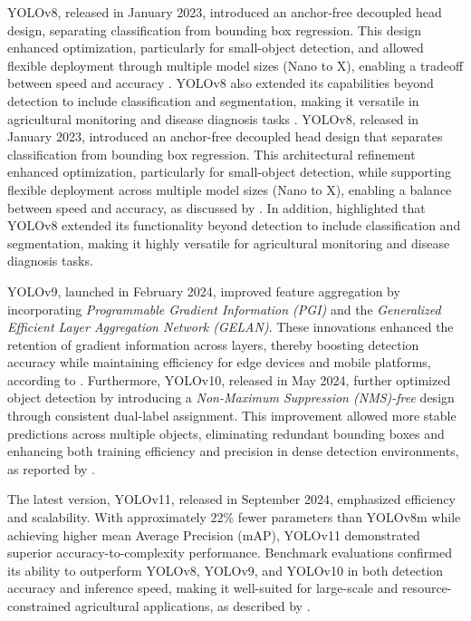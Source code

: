 YOLOv8, released in January 2023, introduced an anchor-free decoupled head design, separating classification from bounding box regression. This design enhanced optimization, particularly for small-object detection, and allowed flexible deployment through multiple model sizes (Nano to X), enabling a tradeoff between speed and accuracy \cite{Wang2023}. YOLOv8 also extended its capabilities beyond detection to include classification and segmentation, making it versatile in agricultural monitoring and disease diagnosis tasks \cite{Vyas2023}.
YOLOv8, released in January 2023, introduced an anchor-free decoupled head design that separates classification from bounding box regression. This architectural refinement enhanced optimization, particularly for small-object detection, while supporting flexible deployment across multiple model sizes (Nano to X), enabling a balance between speed and accuracy, as discussed by \cite{Wang2023}. In addition, \cite{Vyas2023} highlighted that YOLOv8 extended its functionality beyond detection to include classification and segmentation, making it highly versatile for agricultural monitoring and disease diagnosis tasks.

YOLOv9, launched in February 2024, improved feature aggregation by incorporating \textit{Programmable Gradient Information (PGI)} and the \textit{Generalized Efficient Layer Aggregation Network (GELAN)}. These innovations enhanced the retention of gradient information across layers, thereby boosting detection accuracy while maintaining efficiency for edge devices and mobile platforms, according to \cite{UltralyticsBlog2025}. Furthermore, YOLOv10, released in May 2024, further optimized object detection by introducing a \textit{Non-Maximum Suppression (NMS)-free} design through consistent dual-label assignment. This improvement allowed more stable predictions across multiple objects, eliminating redundant bounding boxes and enhancing both training efficiency and precision in dense detection environments, as reported by \cite{UltralyticsBlog2025}.

The latest version, YOLOv11, released in September 2024, emphasized efficiency and scalability. With approximately 22\% fewer parameters than YOLOv8m while achieving higher mean Average Precision (mAP), YOLOv11 demonstrated superior accuracy-to-complexity performance. Benchmark evaluations confirmed its ability to outperform YOLOv8, YOLOv9, and YOLOv10 in both detection accuracy and inference speed, making it well-suited for large-scale and resource-constrained agricultural applications, as described by \cite{UltralyticsBlog2025}.

